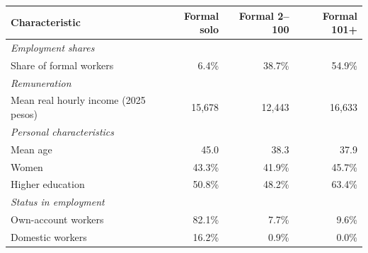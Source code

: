 \begin{tabular}{lrrr}
\toprule
    Characteristic & Formal solo & Formal 2--100 & Formal 101+ \\
    \midrule
\multicolumn{4}{l}{\textit{Employment shares}} \\
Share of formal workers & 6.4\% & 38.7\% & 54.9\% \\
\midrule
    \multicolumn{4}{l}{\textit{Remuneration}} \\
Mean real hourly income (2025 pesos) & 15,678 & 12,443 & 16,633 \\
\midrule
    \multicolumn{4}{l}{\textit{Personal characteristics}} \\
Mean age & 45.0 & 38.3 & 37.9 \\
Women & 43.3\% & 41.9\% & 45.7\% \\
Higher education & 50.8\% & 48.2\% & 63.4\% \\
\midrule
    \multicolumn{4}{l}{\textit{Status in employment}} \\
Own-account workers & 82.1\% & 7.7\% & 9.6\% \\
Domestic workers & 16.2\% & 0.9\% & 0.0\%\\
\bottomrule\end{tabular}
